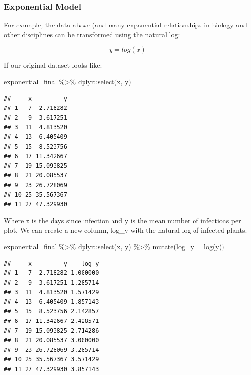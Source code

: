 \documentclass[
]{book}
\newenvironment{Shaded}{\begin{snugshade}}{\end{snugshade}}
\newcommand{\AttributeTok}[1]{\textcolor[rgb]{0.77,0.63,0.00}{#1}}
\newcommand{\FunctionTok}[1]{\textcolor[rgb]{0.00,0.00,0.00}{#1}}
\newcommand{\NormalTok}[1]{#1}
\newcommand{\SpecialCharTok}[1]{\textcolor[rgb]{0.00,0.00,0.00}{#1}}
\begin{document}
\hypertarget{exponential-model}{%
\subsubsection{Exponential Model}\label{exponential-model}}

For example, the data above (and many exponential relationships in biology and other disciplines can be transformed using the natural log:

\[ y = log(x)\]

If our original dataset looks like:

\begin{Shaded}
\begin{Highlighting}[]
\NormalTok{exponential\_final }\SpecialCharTok{\%\textgreater{}\%}
\NormalTok{  dplyr}\SpecialCharTok{::}\FunctionTok{select}\NormalTok{(x, y)}
\end{Highlighting}
\end{Shaded}

\begin{verbatim}
##     x         y
## 1   7  2.718282
## 2   9  3.617251
## 3  11  4.813520
## 4  13  6.405409
## 5  15  8.523756
## 6  17 11.342667
## 7  19 15.093825
## 8  21 20.085537
## 9  23 26.728069
## 10 25 35.567367
## 11 27 47.329930
\end{verbatim}

Where x is the days since infection and y is the mean number of infections per plot.
We can create a new column, log\_y with the natural log of infected plants.

\begin{Shaded}
\begin{Highlighting}[]
\NormalTok{exponential\_final }\SpecialCharTok{\%\textgreater{}\%}
\NormalTok{  dplyr}\SpecialCharTok{::}\FunctionTok{select}\NormalTok{(x, y) }\SpecialCharTok{\%\textgreater{}\%}
  \FunctionTok{mutate}\NormalTok{(}\AttributeTok{log\_y =} \FunctionTok{log}\NormalTok{(y))}
\end{Highlighting}
\end{Shaded}

\begin{verbatim}
##     x         y    log_y
## 1   7  2.718282 1.000000
## 2   9  3.617251 1.285714
## 3  11  4.813520 1.571429
## 4  13  6.405409 1.857143
## 5  15  8.523756 2.142857
## 6  17 11.342667 2.428571
## 7  19 15.093825 2.714286
## 8  21 20.085537 3.000000
## 9  23 26.728069 3.285714
## 10 25 35.567367 3.571429
## 11 27 47.329930 3.857143
\end{verbatim}
\end{document}
